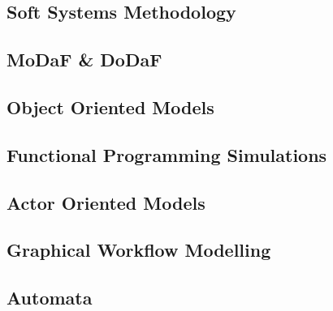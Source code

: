 \subsection{Soft Systems Methodology}


\subsection{MoDaF \& DoDaF}


\subsection{Object Oriented Models}


\subsection{Functional Programming Simulations}


\subsection{Actor Oriented Models}



\subsection{Graphical Workflow Modelling}



\subsection{Automata}


